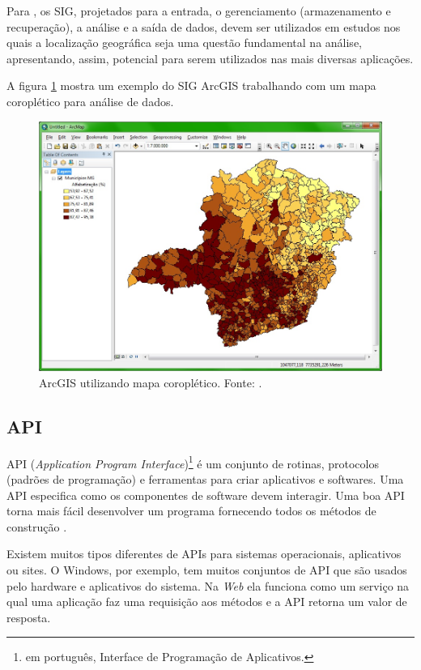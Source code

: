 \documentclass[12pt]{article}
\begin{document}
Para \citet{geois}, os SIG, projetados para a entrada, o gerenciamento (armazenamento e recuperação), a análise e a saída de dados, devem ser utilizados em estudos nos quais a localização geográfica seja uma questão fundamental na análise, apresentando, assim, potencial para serem utilizados nas mais diversas aplicações.

A figura \ref{arcgis} mostra um exemplo do SIG ArcGIS trabalhando com um mapa coroplético para análise de dados.

\begin{figure}[!h]
\centering
\includegraphics[scale=0.5]{ExemploArcGis.jpg}
\caption{ArcGIS utilizando mapa coroplético. Fonte: \citet{andersonm}.}
\label{arcgis}
\end{figure}

\subsection{API}

API (\emph{Application Program Interface})\footnote{em português, Interface de Programação de Aplicativos.} é um conjunto de rotinas, protocolos (padrões de programação) e ferramentas para criar aplicativos e softwares. Uma API especifica como os componentes de software devem interagir. Uma boa API torna mais fácil desenvolver um programa fornecendo todos os métodos de construção \citep{canaltechapi}.

Existem muitos tipos diferentes de APIs para sistemas operacionais, aplicativos ou sites. O Windows, por exemplo, tem muitos conjuntos de API que são usados pelo hardware e aplicativos do sistema. Na \emph{Web} ela funciona como um serviço na qual uma aplicação faz uma requisição aos métodos e a API retorna um valor de resposta.
\end{document}
